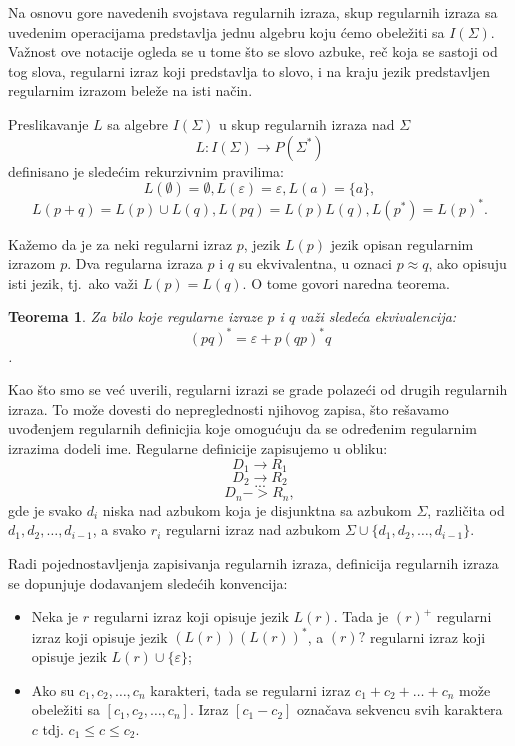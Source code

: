 \documentclass[12pt,oneside]{memoir}
\theoremstyle{plain}
\newtheorem{thm}{Teorema}[chapter] %
\theoremstyle{definition}
\begin{document}
Na osnovu gore navedenih svojstava regularnih izraza, skup regularnih izraza sa uvedenim operacijama predstavlja jednu algebru koju ćemo obeležiti sa $I(\Sigma)$. Važnost ove notacije ogleda se u tome što se slovo azbuke, reč koja se sastoji od tog slova, regularni izraz koji predstavlja to slovo, i na kraju jezik predstavljen regularnim izrazom beleže na isti način. 

Preslikavanje $L$ sa algebre $I(\Sigma)$ u skup regularnih izraza nad $\Sigma$ $$ L : I(\Sigma) \rightarrow P(\Sigma^*)$$ definisano je sledećim rekurzivnim pravilima:
$$ L(\emptyset) = \emptyset, L(\varepsilon) = \varepsilon, L(a) = \{a\},$$
$$ L(p+q) = L(p) \cup L(q), L(pq) = L(p)L(q), L(p^*) = L(p)^*.$$

Kažemo da je za neki regularni izraz $p$, jezik $L(p)$ jezik opisan regularnim izrazom $p$. Dva regularna izraza $p$ i $q$ su ekvivalentna, u oznaci $p \approx q$, ako opisuju isti jezik, tj.~ako važi $L(p) = L(q)$. O tome govori naredna teorema.

\begin{thm}
Za bilo koje regularne izraze $p$ i $q$ važi sledeća ekvivalencija: $$(pq)^* = \varepsilon + p(qp)^* q$$.
\end{thm}

Kao što smo se već uverili, regularni izrazi se grade polazeći od drugih regularnih izraza. To može dovesti do nepreglednosti njihovog zapisa, što rešavamo uvođenjem regularnih definicjia koje omogućuju da se određenim regularnim izrazima dodeli ime. Regularne definicije zapisujemo u obliku:
$$D_1  \rightarrow R_1$$
$$D_2  \rightarrow R_2$$
$$ ... $$
$$D_n -> R_n, $$
gde je svako $d_i$ niska nad azbukom koja je disjunktna sa azbukom $\Sigma$, različita od $d_1, d_2, …, d_{i-1}$, a svako $r_i$ regularni izraz nad azbukom $\Sigma \cup \{ d_1, d_2, …, d_{i-1}\}$.

Radi pojednostavljenja zapisivanja regularnih izraza, definicija regularnih izraza se dopunjuje dodavanjem sledećih konvencija:
\begin{itemize}
\item Neka je $r$ regularni izraz koji opisuje jezik $L(r)$. Tada je $(r)^+$ regularni izraz koji opisuje jezik $(L(r))(L(r))^*$, a $(r)?$ regularni izraz koji opisuje jezik $L(r) \cup \{\varepsilon\}$;
\item Ako su $c_1, c_2, …, c_n$ karakteri, tada se regularni izraz $c_1 + c_2 + … + c_n$ može obeležiti sa $[c_1, c_2, …, c_n]$. Izraz $[c_1-c_2]$ označava sekvencu svih karaktera $c$ tdj. $c_1 \leq c \leq c_2$.
\end{itemize}
\end{document}
